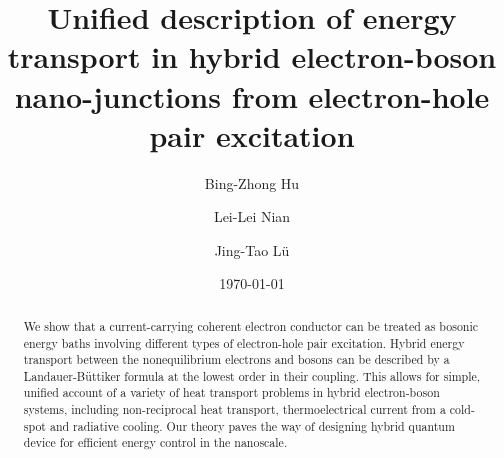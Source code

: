 \documentclass[aps
,twocolumn
,floatfix,footinbib,prl
]{revtex4-1}
\begin{document}


\title{Unified description of energy transport in hybrid electron-boson nano-junctions from electron-hole pair excitation}
\author{Bing-Zhong Hu}
\author{Lei-Lei Nian}
\author{Jing-Tao L\"{u}}


\date{\today}%
\begin{abstract}

We show that a current-carrying coherent electron conductor can be treated as bosonic energy baths involving different types of electron-hole pair excitation. Hybrid energy transport between the nonequilibrium electrons and bosons can be described by a Landauer-B\"uttiker formula at the lowest order in their coupling. This allows for simple, unified account of a variety of heat transport problems in hybrid electron-boson systems, including non-reciprocal heat transport, thermoelectrical current from a cold-spot and radiative cooling. Our theory paves the way of designing hybrid quantum device for efficient energy control in the nanoscale.
\end{abstract}


\maketitle
\end{document}
